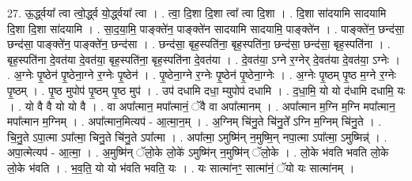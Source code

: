 \documentclass[17pt]{extarticle}
\begin{document}
27. ऊ॒र्द्ध्वया᳚ त्वा त्वो॒र्द्ध्व यो॒र्द्ध्वया᳚ त्वा । . त्वा॒ दि॒शा दि॒शा त्वा᳚ त्वा दि॒शा । . दि॒शा सा॑दयामि सादयामि दि॒शा दि॒शा सा॑दयामि । . सा॒द॒या॒मि॒ पाङ्क्ते॑न॒ पाङ्क्ते॑न सादयामि सादयामि॒ पाङ्क्ते॑न । . पाङ्क्ते॑न॒ छन्द॑सा॒ छन्द॑सा॒ पाङ्क्ते॑न॒ पाङ्क्ते॑न॒ छन्द॑सा । . छन्द॑सा॒ बृह॒स्पति॑ना॒ बृह॒स्पति॑ना॒ छन्द॑सा॒ छन्द॑सा॒ बृह॒स्पति॑ना । . बृह॒स्पति॑ना दे॒वत॑या दे॒वत॑या॒ बृह॒स्पति॑ना॒ बृह॒स्पति॑ना दे॒वत॑या । . दे॒वत॑या॒ ऽग्ने र॒ग्नेर् दे॒वत॑या दे॒वत॑या॒ ऽग्नेः । . अ॒ग्नेः पृ॒ष्ठेन॑ पृ॒ष्ठेना॒ग्ने र॒ग्नेः पृ॒ष्ठेन॑ । . पृ॒ष्ठेना॒ग्ने र॒ग्नेः पृ॒ष्ठेन॑ पृ॒ष्ठेना॒ग्नेः । . अ॒ग्नेः पृ॒ष्ठम् पृ॒ष्ठ म॒ग्ने र॒ग्नेः पृ॒ष्ठम् । . पृ॒ष्ठ मुपोप॑ पृ॒ष्ठम् पृ॒ष्ठ मुप॑ । . उप॑ दधामि दधा॒ म्युपोप॑ दधामि । . द॒धा॒मि॒ यो यो द॑धामि दधामि॒ यः । . यो वै वै यो यो वै । . वा अपा᳚त्मान॒ मपा᳚त्मानं॒ ॅवै वा अपा᳚त्मानम् । . अपा᳚त्मान म॒ग्नि म॒ग्नि मपा᳚त्मान॒ मपा᳚त्मान म॒ग्निम् । . अपा᳚त्मान॒मित्यप॑ - आ॒त्मा॒न॒म् । . अ॒ग्निम् चि॑नु॒ते चि॑नु॒ते᳚ ऽग्नि म॒ग्निम् चि॑नु॒ते । . चि॒नु॒ते ऽपा॒त्मा ऽपा᳚त्मा॒ चिनु॒ते चि॑नु॒ते ऽपा᳚त्मा । . अपा᳚त्मा॒ ऽमुष्मि॑न् न॒मुष्मि॒न् नपा॒त्मा ऽपा᳚त्मा॒ ऽमुष्मिन्न्॑ । . अपा॒त्मेत्यप॑ - आ॒त्मा॒ । . अ॒मुष्मि॑न् ॅलो॒के लो॒के॑ ऽमुष्मि॑न् न॒मुष्मि॑न् ॅलो॒के । . लो॒के भ॑वति भवति लो॒के लो॒के भ॑वति । . भ॒व॒ति॒ यो यो भ॑वति भवति॒ यः । . यः सात्मा॑नꣳ॒॒ सात्मा॑नं॒ ॅयो यः सात्मा॑नम् । \newline
\end{document}
